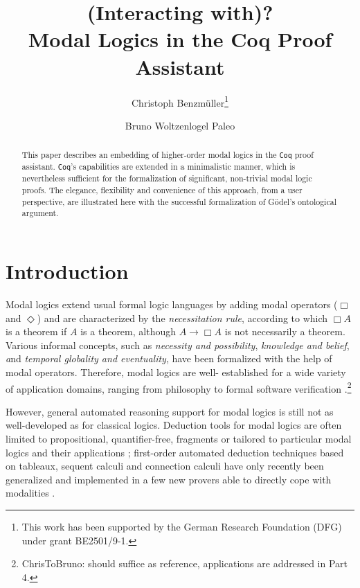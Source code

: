 \documentclass{llncs}
\title{
(Interacting with)? \\ Modal Logics in the Coq Proof Assistant
}
\author{
  Christoph Benzm\"{u}ller\inst{1}\thanks{This work has been supported by the German Research Foundation (DFG) under grant BE2501/9-1.} 
  \and 
  Bruno Woltzenlogel Paleo\inst{2}
}
\institute{
  Freie Universit\"{a}t Berlin, Germany,  %
  \email{c.benzmueller@fu-berlin.de}
  \and 
  Vienna University of Technology, Austria, %
   \email{bruno@logic.at}
}
\newcommand{\imp}{\rightarrow}
\newcommand{\Coq}{\texttt{Coq}\xspace}
\begin{document}
\maketitle

\begin{abstract}  
  This paper describes an embedding of higher-order modal logics in
  the \Coq proof assistant. {\Coq}'s capabilities are extended in a
  minimalistic manner, which is nevertheless sufficient for the
  formalization of significant, non-trivial modal logic proofs. The
  elegance, flexibility and convenience of this approach, from a user
  perspective, are illustrated here with the successful formalization
  of Gödel's ontological argument.
\end{abstract}



\section{Introduction}

Modal logics extend usual formal logic languages by adding modal
operators ($\Box$ and $\Diamond$) and are characterized by the
\emph{necessitation rule}, according to which $\Box A$ is a theorem if
$A$ is a theorem, although $A \imp \Box A$ is not necessarily a
theorem. Various informal concepts, such as \emph{necessity and
possibility}, \emph{knowledge and belief}, \emph and \emph{temporal
globality and eventuality}, have been formalized with the help of
modal operators. Therefore, modal logics \cite{ModalLogic} are well-
established for a wide variety of application domains, ranging from
philosophy \cite{ToDo} to formal software verification
\cite{ToDo:TLAPlus}.\footnote{ChrisToBruno: \cite{ModalLogic} should
  suffice as reference, applications are addressed in Part 4.}

However, general automated reasoning support for modal logics is still
not as well-developed as for classical logics. Deduction tools
for modal logics are often limited to propositional, quantifier-free,
fragments \cite{ToDo:SeeBjornsProposal} or tailored to particular
modal logics and their applications \cite{ToDo:StephanMerz}; 
first-order automated deduction techniques based on tableaux, sequent
calculi and connection calculi have only recently been generalized 
and implemented in a few new provers able to directly cope with
modalities \cite{JensOtten}.
\end{document}

